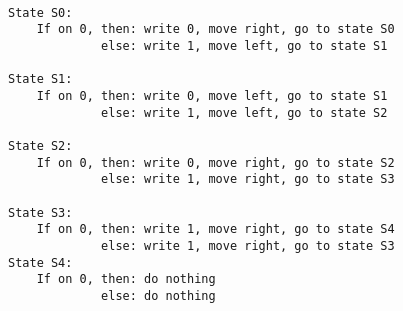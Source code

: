 \begin{verbatim}

State S0:
    If on 0, then: write 0, move right, go to state S0
             else: write 1, move left, go to state S1

State S1:
    If on 0, then: write 0, move left, go to state S1
             else: write 1, move left, go to state S2

State S2:
    If on 0, then: write 0, move right, go to state S2
             else: write 1, move right, go to state S3

State S3:
    If on 0, then: write 1, move right, go to state S4
             else: write 1, move right, go to state S3
State S4:
    If on 0, then: do nothing
             else: do nothing
    
\end{verbatim}


